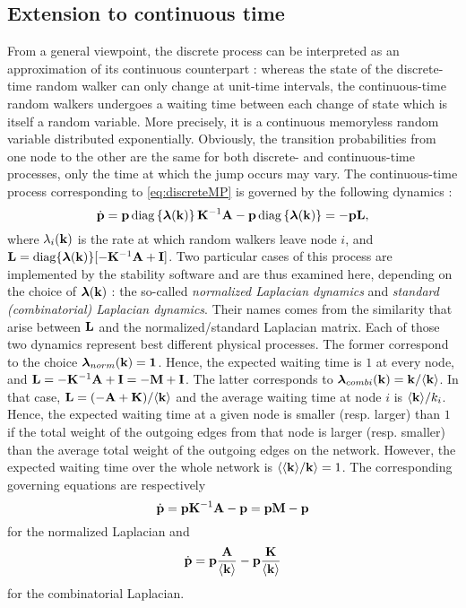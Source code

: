 \subsection{Extension to continuous time}
From a general viewpoint, the discrete process can be interpreted as an approximation of its continuous counterpart : whereas the state of the discrete-time random walker can only change at unit-time intervals, the continuous-time random walkers undergoes a waiting time between each change of state which is itself a random variable. More precisely, it is a continuous memoryless random variable distributed exponentially. Obviously, the transition probabilities from one node to the other are the same for both discrete- and continuous-time processes, only the time at which the jump occurs may vary. The continuous-time process corresponding to \eqref{eq:discreteMP} is governed by the following dynamics :
\begin{equation} \label{eq:continuousMP_general}
    	\dot{\mathbf p} = \mathbf p \operatorname{diag}\left\{\boldsymbol \lambda(\mathbf k)\right\} \mathbf K^{-1} \mathbf A - \mathbf p \operatorname{diag}\left\{\boldsymbol \lambda(\mathbf k)\right\} = -\mathbf p \mathbf L,
\end{equation}
where $\lambda_i(\mathbf k)$ is the rate at which random walkers leave node $i$, and $\mathbf L = \operatorname{diag}\{\boldsymbol \lambda(\mathbf k)\}[-\mathbf K^{-1} \mathbf A + \mathbf I]$. Two particular cases of this process are implemented by the stability software and are thus examined here, depending on the choice of $\boldsymbol \lambda(\mathbf k)$ : the so-called \textit{normalized Laplacian dynamics} and \textit{standard (combinatorial) Laplacian dynamics}. Their names comes from the similarity that arise between $\mathbf L$ and the normalized/standard Laplacian matrix. Each of those two dynamics represent best different physical processes. The former correspond to the choice $\boldsymbol \lambda_{norm}(\mathbf k) = \mathbf 1$. Hence, the expected waiting time is $1$ at every node, and $\mathbf L = -\mathbf K^{-1} \mathbf A + \mathbf I = -\mathbf M + \mathbf I$. The latter corresponds to $\boldsymbol \lambda_{combi}(\mathbf k) = \mathbf k/\langle \mathbf k \rangle$. In that case, $\mathbf L = (-\mathbf A + \mathbf K)/\langle \mathbf k \rangle$ and the average waiting time at node $i$ is $\langle \mathbf k \rangle/k_i$. Hence, the expected waiting time at a given node is smaller (resp. larger) than $1$ if the total weight of the outgoing edges from that node is larger (resp. smaller) than the average total weight of the outgoing edges on the network. However, the expected waiting time over the whole network is $\langle \langle \mathbf k \rangle/\mathbf k \rangle = 1$. The corresponding governing equations are respectively 
\begin{equation} \label{eq:continuousMP_norm}
	\dot{\mathbf p} = \mathbf p \mathbf K^{-1} \mathbf A - \mathbf p = \mathbf p \mathbf M - \mathbf p
\end{equation}
for the normalized Laplacian and
\begin{equation} \label{eq:continuousMP_combi}
    	\dot{\mathbf p} = \mathbf p \frac{\mathbf A}{\langle \mathbf k \rangle} - \mathbf p\frac{\mathbf K}{\langle \mathbf k \rangle}
\end{equation}
for the combinatorial Laplacian.

